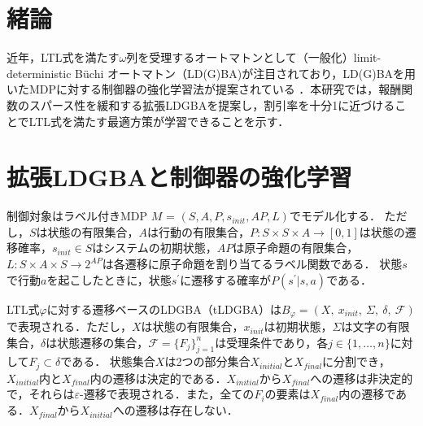 \documentclass[a4j,9pt,twocolumn]{jsarticle}
\theoremstyle{definition}
\begin{document}

\section{緒論}
近年，LTL式を満たす$\omega$列を受理するオートマトンとして（一般化）limit-deterministic B\"{u}chi オートマトン（LD(G)BA)が注目されており，LD(G)BAを用いたMDPに対する制御器の強化学習法が提案されている \cite{HAK2019,Hahn2019}．本研究では，報酬関数のスパース性を緩和する拡張LDGBAを提案し，割引率を十分1に近づけることでLTL式を満たす最適方策が学習できることを示す．

\section{拡張LDGBAと制御器の強化学習}
制御対象はラベル付きMDP $M$ = $(S, A, P, s_{init}, AP, L)$でモデル化する．
ただし，$S$は状態の有限集合，$A$は行動の有限集合，$P : S \times S \times A \to [0,1]$は状態の遷移確率，$s_{init} \in S$はシステムの初期状態，$AP$は原子命題の有限集合，$L : S \times A \times S \to 2^{AP}$は各遷移に原子命題を割り当てるラベル関数である．
状態$s$で行動$a$を起こしたときに，状態$s^{\prime}$に遷移する確率が$P(s^{\prime}|s,a)$である．

LTL式$\varphi$に対する遷移ベースのLDGBA（tLDGBA）は$B_{\varphi}= (X,\ x_{init},\ \Sigma,\ \delta,\ \mathcal{F})$で表現される．ただし，$X$は状態の有限集合，$x_{init}$は初期状態，$\Sigma$は文字の有限集合，$\delta$は状態遷移の集合，$\mathcal{F}=\{ F_j \} _{j=1}^{n}$は受理条件であり，各$j\in\{ 1,\ldots,  n \}$に対して$F_j \subset \delta$である．
状態集合$X$は2つの部分集合$X_{initial}$と$X_{final}$に分割でき，$X_{initial}$内と$X_{final}$内の遷移は決定的である．$X_{initial}$から$X_{final}$への遷移は非決定的で，それらは$\varepsilon$-遷移で表現される．また，全ての$F_i$の要素は$X_{final}$内の遷移である．$X_{final}$から$X_{initial}$への遷移は存在しない．
\end{document}
